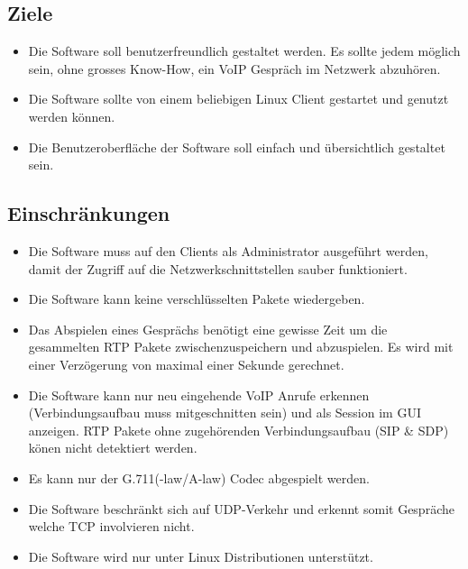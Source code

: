 \documentclass[a4,12pt]{scrartcl}
\begin{document}
\subsection{Ziele}
\begin{itemize}
\item Die Software soll benutzerfreundlich gestaltet werden. Es sollte jedem möglich sein, ohne grosses Know-How, ein VoIP Gespräch im Netzwerk abzuhören. 
\item Die Software sollte von einem beliebigen Linux Client gestartet und genutzt werden können. 
\item Die Benutzeroberfläche der Software soll einfach und übersichtlich gestaltet sein.
\end{itemize}
\subsection{Einschränkungen}
\begin{itemize}
\item Die Software muss auf den Clients als Administrator ausgeführt werden, damit der Zugriff auf die Netzwerkschnittstellen sauber funktioniert. 
\item Die Software kann keine verschlüsselten Pakete wiedergeben. 
\item Das Abspielen eines Gesprächs benötigt eine gewisse Zeit um die gesammelten RTP Pakete zwischenzuspeichern und abzuspielen. Es wird mit einer Verzögerung von maximal einer  Sekunde gerechnet.
\item Die Software kann nur neu eingehende VoIP Anrufe erkennen (Verbindungsaufbau muss mitgeschnitten sein) und als Session im GUI anzeigen. RTP Pakete ohne zugehörenden Verbindungsaufbau (SIP & SDP) könen nicht detektiert werden. 
\item Es kann nur der G.711(\textmu -law/A-law) Codec abgespielt werden.
\item Die Software beschränkt sich auf UDP-Verkehr und erkennt somit Gespräche welche TCP involvieren nicht.
\item Die Software wird nur unter Linux Distributionen unterstützt.
\end{itemize}
\end{document}
